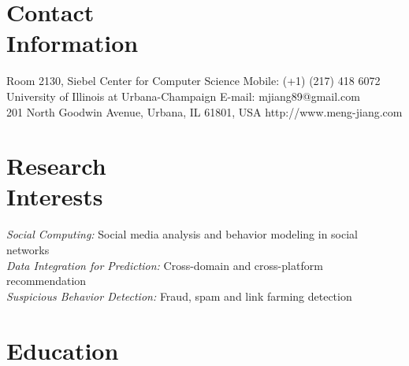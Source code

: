 \documentclass[margin, 10pt]{res} %
\begin{document}
\begin{resume}


\section{Contact \\ Information}

{Room 2130, Siebel Center for Computer Science} \hfill {Mobile:} {(+1) (217) 418 6072} \\
{University of Illinois at Urbana-Champaign} \hfill {E-mail:} {mjiang89@gmail.com} \\
{201 North Goodwin Avenue, Urbana, IL 61801, USA} \hfill {http://www.meng-jiang.com}


\section{Research \\ Interests}

{\em Social Computing:} Social media analysis and behavior modeling in social networks \\
{\em Data Integration for Prediction:} Cross-domain and cross-platform recommendation \\
{\em Suspicious Behavior Detection:} Fraud, spam and link farming detection


\section{Education}


\end{resume}
\end{document}
